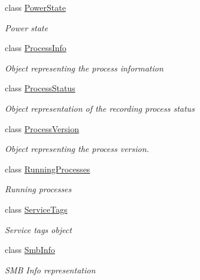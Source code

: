 \begin{DoxyCompactItemize}
class \hyperlink{class_microsoft_1_1_tools_1_1_windows_device_portal_1_1_device_portal_1_1_power_state}{Power\+State}
\begin{DoxyCompactList}\small\item\em Power state \end{DoxyCompactList}\item 
class \hyperlink{class_microsoft_1_1_tools_1_1_windows_device_portal_1_1_device_portal_1_1_process_info}{Process\+Info}
\begin{DoxyCompactList}\small\item\em Object representing the process information \end{DoxyCompactList}\item 
class \hyperlink{class_microsoft_1_1_tools_1_1_windows_device_portal_1_1_device_portal_1_1_process_status}{Process\+Status}
\begin{DoxyCompactList}\small\item\em Object representation of the recording process status \end{DoxyCompactList}\item 
class \hyperlink{class_microsoft_1_1_tools_1_1_windows_device_portal_1_1_device_portal_1_1_process_version}{Process\+Version}
\begin{DoxyCompactList}\small\item\em Object representing the process version. \end{DoxyCompactList}\item 
class \hyperlink{class_microsoft_1_1_tools_1_1_windows_device_portal_1_1_device_portal_1_1_running_processes}{Running\+Processes}
\begin{DoxyCompactList}\small\item\em Running processes \end{DoxyCompactList}\item 
class \hyperlink{class_microsoft_1_1_tools_1_1_windows_device_portal_1_1_device_portal_1_1_service_tags}{Service\+Tags}
\begin{DoxyCompactList}\small\item\em Service tags object \end{DoxyCompactList}\item 
class \hyperlink{class_microsoft_1_1_tools_1_1_windows_device_portal_1_1_device_portal_1_1_smb_info}{Smb\+Info}
\begin{DoxyCompactList}\small\item\em S\+MB Info representation \end{DoxyCompactList}\item 

\end{DoxyCompactItemize}

